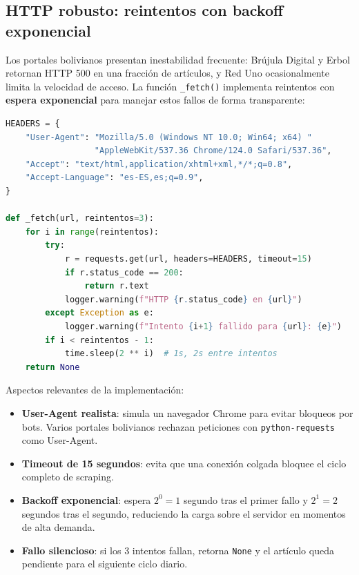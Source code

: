 \documentclass[12pt,a4paper]{article}
\begin{document}
\subsection{HTTP robusto: reintentos con backoff exponencial}

Los portales bolivianos presentan inestabilidad frecuente: Brújula Digital y Erbol retornan HTTP 500 en una fracción de artículos, y Red Uno ocasionalmente limita la velocidad de acceso. La función \texttt{\_fetch()} implementa reintentos con \textbf{espera exponencial} para manejar estos fallos de forma transparente:

\begin{lstlisting}[language=Python, caption=Función \_fetch con reintentos y backoff exponencial (portal.py)]
HEADERS = {
    "User-Agent": "Mozilla/5.0 (Windows NT 10.0; Win64; x64) "
                  "AppleWebKit/537.36 Chrome/124.0 Safari/537.36",
    "Accept": "text/html,application/xhtml+xml,*/*;q=0.8",
    "Accept-Language": "es-ES,es;q=0.9",
}

def _fetch(url, reintentos=3):
    for i in range(reintentos):
        try:
            r = requests.get(url, headers=HEADERS, timeout=15)
            if r.status_code == 200:
                return r.text
            logger.warning(f"HTTP {r.status_code} en {url}")
        except Exception as e:
            logger.warning(f"Intento {i+1} fallido para {url}: {e}")
        if i < reintentos - 1:
            time.sleep(2 ** i)  # 1s, 2s entre intentos
    return None
\end{lstlisting}

Aspectos relevantes de la implementación:

\begin{itemize}[nosep]
  \item \textbf{User-Agent realista}: simula un navegador Chrome para evitar bloqueos por bots. Varios portales bolivianos rechazan peticiones con \texttt{python-requests} como User-Agent.
  \item \textbf{Timeout de 15 segundos}: evita que una conexión colgada bloquee el ciclo completo de scraping.
  \item \textbf{Backoff exponencial}: espera $2^0=1$ segundo tras el primer fallo y $2^1=2$ segundos tras el segundo, reduciendo la carga sobre el servidor en momentos de alta demanda.
  \item \textbf{Fallo silencioso}: si los 3 intentos fallan, retorna \texttt{None} y el artículo queda pendiente para el siguiente ciclo diario.
\end{itemize}
\end{document}
